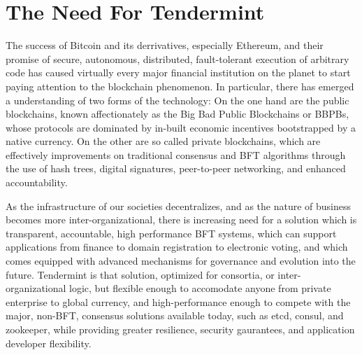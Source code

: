 \section{The Need For Tendermint}

The success of Bitcoin and its derrivatives, especially Ethereum, and their promise of secure, autonomous, distributed, fault-tolerant execution of arbitrary code has caused virtually every major financial institution on the planet to start paying attention to the blockchain phenomenon. 
In particular, there has emerged a understanding of two forms of the technology:
On the one hand are the public blockchains, known affectionately as the Big Bad Public Blockchains or BBPBs, 
whose protocols are dominated by in-built economic incentives bootstrapped by a native currency.
On the other are so called private blockchains, which are effectively improvements on traditional consensus and BFT algorithms through the use of hash trees, digital signatures, peer-to-peer networking, and enhanced accountability.

As the infrastructure of our societies decentralizes, and as the nature of business becomes more inter-organizational,
there is increasing need for a solution which is transparent, accountable, high performance BFT systems, which can support applications from finance to domain registration to electronic voting,
and which comes equipped with advanced mechanisms for governance and evolution into the future.
Tendermint is that solution, optimized for consortia, or inter-organizational logic, but flexible enough to accomodate anyone from private enterprise to global currency,
and high-performance enough to compete with the major, non-BFT, consensus solutions available today, such as etcd, consul, and zookeeper, while providing greater resilience, security gaurantees, and application developer flexibility.

